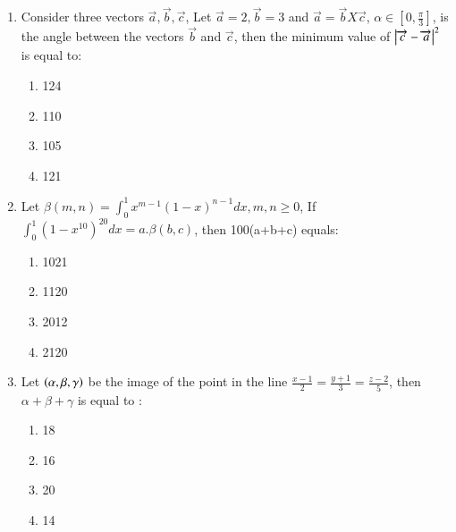 \documentclass[journal]{IEEEtran}
\begin{document}
\begin{enumerate}
    \item Consider three vectors $\overrightarrow{a},\overrightarrow{b},\overrightarrow{c}$, Let $\overrightarrow{a}=2,\overrightarrow{b}=3$ and $\overrightarrow{a}=\overrightarrow{b}X\overrightarrow{c}$, $\alpha \in [0,\frac{\pi}{3}]$, is the angle between the vectors $\overrightarrow{b}$ and $\overrightarrow{c}$, then the minimum value of $\left\vert\overrightarrow{c}-\overrightarrow{a}\right\vert^2$ is equal to:
		\begin{multicols}{4}
			\begin{enumerate}
				
				\item 124
    \item 110
     \item 105
      \item 121
			\end{enumerate}
		\end{multicols}

    \item Let $\beta(m,n)=\int_{0}^{1} x^{m-1} (1-x)^{n-1}dx, m,n\geq0$, If $\int_{0}^{1} (1-x^10)^20 dx=a.\beta(b,c)$, then 100(a+b+c) equals:
    \begin{multicols}{4}
            \begin{enumerate}
              \item 1021
              \item 1120
              \item 2012
              \item 2120
            \end{enumerate}
        \end{multicols}
    \item Let $\left(\alpha,\beta,\gamma\right)$ be the image of the point  in the line $\frac{x-1}{2}=\frac{y+1}{3}=\frac{z-2}{5}$, then $\alpha+\beta+\gamma$ is equal to : 
    \begin{multicols}{4}
            \begin{enumerate}
              \item 18
              \item  16
              \item  20
              \item 14 
              \end{enumerate}
        \end{multicols}


\end{enumerate}
\end{document}
